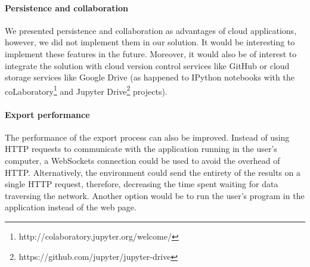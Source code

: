 \paragraph{Persistence and collaboration}
We presented persistence and collaboration as advantages of cloud applications, however, we did not implement them in our solution.
It would be interesting to implement these features in the future.
Moreover, it would also be of interest to integrate the solution with cloud version control services like GitHub or cloud storage services like Google Drive (as happened to IPython notebooks with the coLaboratory\footnote{http://colaboratory.jupyter.org/welcome/} and Jupyter Drive\footnote{https://github.com/jupyter/jupyter-drive} projects).

\paragraph{Export performance}
The performance of the export process can also be improved.
Instead of using HTTP requests to communicate with the application running in the user's computer, a WebSockets connection\cite{rfc6455} could be used to avoid the overhead of HTTP.
Alternatively, the environment could send the entirety of the results on a single HTTP request, therefore, decreasing the time spent waiting for data traversing the network.
Another option would be to run the user's program in the application instead of the web page.












